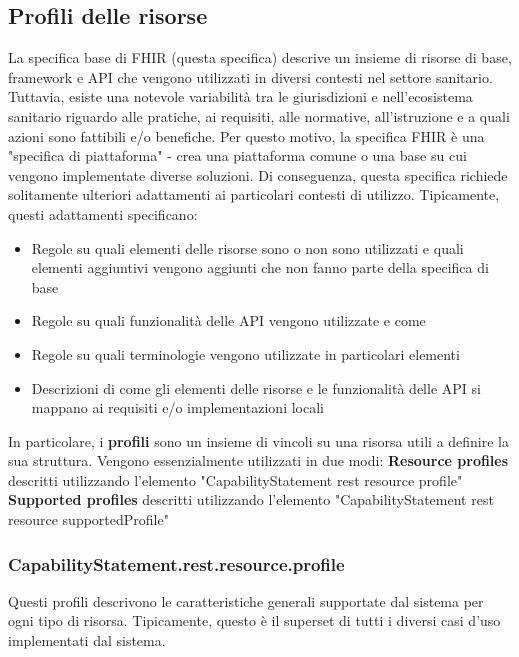 \documentclass{article}
\begin{document}
\subsection{Profili delle risorse}
La specifica base di FHIR (questa specifica) descrive un insieme di risorse di base, framework e API che vengono utilizzati in diversi contesti nel settore sanitario. Tuttavia, esiste una notevole variabilità tra le giurisdizioni e nell'ecosistema sanitario riguardo alle pratiche, ai requisiti, alle normative, all'istruzione e a quali azioni sono fattibili e/o benefiche.
Per questo motivo, la specifica FHIR è una "specifica di piattaforma" - crea una piattaforma comune o una base su cui vengono implementate diverse soluzioni. Di conseguenza, questa specifica richiede solitamente ulteriori adattamenti ai particolari contesti di utilizzo. Tipicamente, questi adattamenti specificano:
\begin{itemize}
    \item Regole su quali elementi delle risorse sono o non sono utilizzati e quali elementi aggiuntivi vengono aggiunti che non fanno parte della specifica di base
    \item Regole su quali funzionalità delle API vengono utilizzate e come
    \item Regole su quali terminologie vengono utilizzate in particolari elementi
    \item Descrizioni di come gli elementi delle risorse e le funzionalità delle API si mappano ai requisiti e/o implementazioni locali
\end{itemize}
In particolare, i \textbf{profili} sono un insieme di vincoli su una risorsa utili a definire la sua struttura.
Vengono essenzialmente utilizzati in due modi:
\textbf{Resource profiles} descritti utilizzando l'elemento "CapabilityStatement rest resource profile"
\textbf{Supported profiles} descritti utilizzando l'elemento "CapabilityStatement rest resource supportedProfile"
\subsubsection{CapabilityStatement.rest.resource.profile}
Questi profili descrivono le caratteristiche generali supportate dal sistema per ogni tipo di risorsa.
Tipicamente, questo è il superset di tutti i diversi casi d'uso implementati dal sistema.
\end{document}
